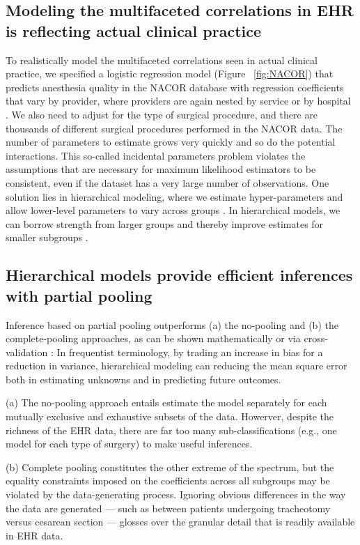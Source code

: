 \documentclass[11pt,notitlepage]{article}
\begin{document}
\subsection*{Modeling the multifaceted correlations in EHR is reflecting actual clinical practice}
To realistically model the multifaceted correlations seen in actual clinical 
practice, we specified a logistic regression model  (Figure~ \ref{fig:NACOR}) 
that predicts anesthesia quality in the NACOR database
with regression coefficients that vary by provider, where providers 
are again nested by service or by hospital 
\cite{AndreaeWhite2015}. We also need to adjust for the type of surgical procedure, and there are 
thousands of different surgical procedures performed in the NACOR data. The number 
of parameters to estimate grows very quickly and so do the potential interactions. This so-called
incidental parameters problem violates the assumptions that are necessary for maximum likelihood
estimators to be consistent, even if the dataset has a very large number of observations.
One solution lies in hierarchical modeling, where we estimate hyper-parameters and allow
lower-level parameters to vary across groups \cite{Bafumi_Gelman_2007}. 
In hierarchical models, we can borrow strength from larger groups and thereby improve estimates for 
smaller subgroups \cite{ParkGelman2004bayesian}.

\subsection*{Hierarchical models provide efficient inferences with partial pooling}
Inference based on partial pooling outperforms (a) the no-pooling and (b) the 
complete-pooling approaches, as can be shown mathematically \cite{Efron_1975} 
or via cross-validation \cite{Gelman-Hill_2014}: In frequentist terminology, by trading an increase in 
bias for a reduction in variance, hierarchical modeling can reducing the mean square error both
in estimating unknowns and in predicting future outcomes.

(a) The no-pooling approach entails estimate the model separately for each mutually exclusive and
exhaustive subsets of the data. Howerver, despite the richness of the EHR data, there are far too many 
sub-classifications (e.g., one model for each type of surgery) to make useful inferences.

(b) Complete pooling constitutes the other extreme of the spectrum, but the equality constraints 
imposed on the coefficients across all subgroups may be violated by the data-generating process. 
Ignoring obvious differences in the way the data are generated --- such 
as between patients undergoing tracheotomy versus cesarean section --- glosses
over the granular detail that is readily available in EHR data.
\end{document}
